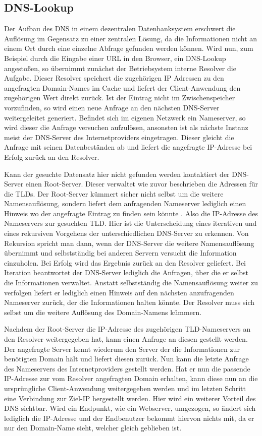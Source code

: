 \subsection{DNS-Lookup}
Der Aufbau des DNS in einem dezentralen Datenbanksystem erschwert die Auflösung im Gegensatz zu einer zentralen Lösung, da die Informationen nicht an einem Ort durch eine einzelne Abfrage gefunden werden können. Wird nun, zum Beispiel durch die Eingabe einer URL in den Browser, ein DNS-Lookup angestoßen, so übernimmt zunächst der Betriebsystem interne Resolver die Aufgabe. Dieser Resolver speichert die zugehörigen IP Adressen zu den angefragten Domain-Names im Cache und liefert der Client-Anwendung den zugehörigen Wert direkt zurück.  Ist der Eintrag nicht im Zwischenspeicher vorzufinden, so wird einen neue Anfrage  an den nächsten DNS-Server weitergeleitet generiert. Befindet sich im eigenen Netzwerk ein Nameserver, so wird dieser die Anfrage versuchen aufzulösen, ansonsten ist als nächste Instanz meist der DNS-Server des Internetproviders eingetragen. Dieser gleicht die Anfrage mit seinen Datenbeständen ab und liefert die angefragte IP-Adresse bei Erfolg zurück an den Resolver. \cite{1und1.22.01.2018}

Kann der gesuchte Datensatz hier nicht gefunden werden kontaktiert der DNS-Server einen Root-Server. Dieser verwaltet wie zuvor beschrieben die Adressen für die TLDs. Der Root-Server kümmert sicher nicht selbst um die weitere Namensauflösung, sondern liefert dem anfragenden Nameserver lediglich einen Hinweis wo der angefragte Eintrag zu finden sein könnte \cite{Schreiner.2016}. Also die IP-Adresse des Nameservers zur gesuchten TLD. Hier ist die Unterscheidung eines iterativen und eines rekursiven Vorgehens der unterschiedlichen DNS-Server zu erkennen. Von Rekursion spricht man dann, wenn der DNS-Server die weitere Namensauflösung übernimmt und selbstständig bei anderen Servern versucht die Information einzuholen. Bei Erfolg wird das Ergebnis zurück an den Resolver geliefert. Bei Iteration beantwortet der DNS-Server lediglich die Anfragen, über die er selbst die Informationen verwaltet. Anstatt selbstständig die Namensauflösung weiter zu verfolgen liefert er lediglich einen Hinweis auf den nächsten anzufragenden Nameserver zurück, der die Informationen halten könnte. Der Resolver muss sich selbst um die weitere Auflösung des Domain-Namens kümmern. \cite{1und1.22.01.2018}

Nachdem der Root-Server die IP-Adresse des zugehörigen TLD-Nameservers an den Resolver weitergegeben hat, kann einen Anfrage an diesen gestellt werden. Der angefragte Server kennt wiederum den Server der die Informationen zur benötigten Domain hält und liefert diesen zurück. Nun kann die letzte Anfrage des Nameservers des Internetproviders gestellt werden. Hat er nun die passende IP-Adresse zur vom Resolver angefragten Domain erhalten, kann diese nun an die ursprüngliche Client-Anwendung weitergegeben werden und im letzten Schritt eine Verbindung zur Ziel-IP hergestellt werden. Hier wird ein weiterer Vorteil des DNS sichtbar. Wird ein Endpunkt, wie ein Webserver, umgezogen, so ändert sich lediglich die IP-Adresse und der Endbenutzer bekommt hiervon nichts mit, da er nur den Domain-Name sieht, welcher gleich geblieben ist. \cite{Schreiner.2016}

